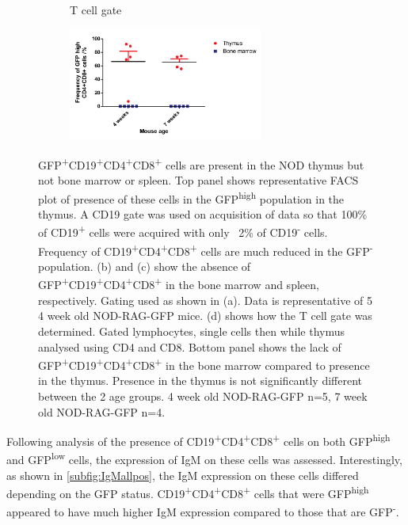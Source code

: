 \begin{figure}
\begin{subfigure}{0.3\textwidth}
	\caption{T cell gate}
	\label{subfig:Tcellgate}
	\end{subfigure}
	\begin{subfigure}{\textwidth}
	\centering
	\includegraphics[width=0.7\textwidth]{Figures/RAGCD19CD4CD8ThyBM.pdf}
	\caption{}
	\label{BMvThyDPgraph}
	\end{subfigure}
\caption[There are GFP\textsuperscript{+}CD19\textsuperscript{+}CD4\textsuperscript{+}CD8\textsuperscript{+} cells present in the NOD thymus] {GFP\textsuperscript{+}CD19\textsuperscript{+}CD4\textsuperscript{+}CD8\textsuperscript{+} cells are present in the NOD thymus but not bone marrow or spleen.
Top panel shows representative FACS plot of presence of these cells in the GFP\textsuperscript{high} population in the thymus. A CD19 gate was used on acquisition of data so that 100\% of CD19\textsuperscript{+} cells were acquired with only ~2\% of CD19\textsuperscript{-} cells.
Frequency of CD19\textsuperscript{+}CD4\textsuperscript{+}CD8\textsuperscript{+} cells are much reduced in the GFP\textsuperscript{-} population.
(b) and (c) show the absence of GFP\textsuperscript{+}CD19\textsuperscript{+}CD4\textsuperscript{+}CD8\textsuperscript{+} in the bone marrow and spleen, respectively. Gating used as shown in (a). Data is representative of 5 4 week old NOD-RAG-GFP mice.
(d) shows how the T cell gate was determined. Gated lymphocytes, single cells then while thymus analysed using CD4 and CD8.
Bottom panel shows the lack of GFP\textsuperscript{+}CD19\textsuperscript{+}CD4\textsuperscript{+}CD8\textsuperscript{+} in the bone marrow compared to presence in the thymus. Presence in the thymus is not significantly different between the 2 age groups.
4 week old NOD-RAG-GFP n=5, 7 week old NOD-RAG-GFP n=4.}
\label{fig:RAGCD19DP}
\end{figure}



Following analysis of the presence of CD19\textsuperscript{+}CD4\textsuperscript{+}CD8\textsuperscript{+} cells on both GFP\textsuperscript{high} and GFP\textsuperscript{low} cells, the expression of IgM on these cells was assessed.
Interestingly, as shown in \cref{subfig:IgMallpos}, the IgM expression on these cells differed depending on the GFP status.
CD19\textsuperscript{+}CD4\textsuperscript{+}CD8\textsuperscript{+} cells that were GFP\textsuperscript{high} appeared to have much higher IgM expression compared to those that are GFP\textsuperscript{-}.

